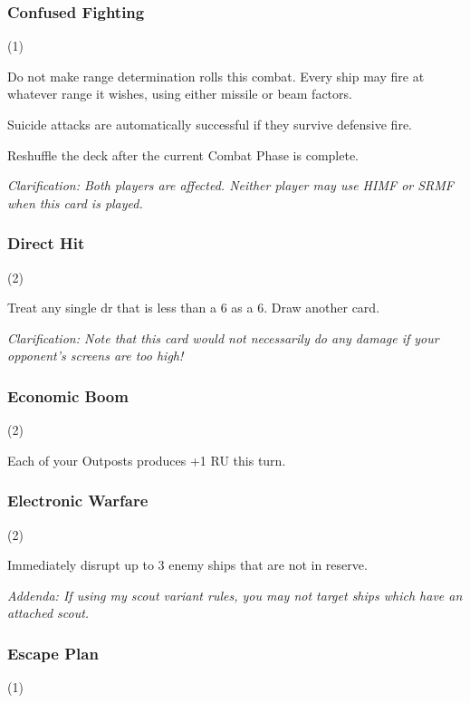 \subsubsection{Confused Fighting} (1)


Do not make range determination rolls this combat. Every ship may fire at whatever range it wishes, using either missile or beam factors.

Suicide attacks are automatically successful if they survive defensive fire.

Reshuffle the deck after the current Combat Phase is complete.

\textit{Clarification: Both players are affected. Neither player may use HIMF or SRMF when this card is played.}

\subsubsection{Direct Hit} (2)


Treat any single dr that is less than a 6 as a 6. Draw another card.

\textit{Clarification: Note that this card would not necessarily do any damage if your opponent's screens are too high!}

\subsubsection{Economic Boom} (2)


Each of your Outposts produces +1 RU this turn.

\subsubsection{Electronic Warfare} (2)


Immediately disrupt up to 3 enemy ships that are not in reserve.

\textit{Addenda: If using my scout variant rules, you may not target ships which have an attached scout.}

\subsubsection{Escape Plan} (1)

